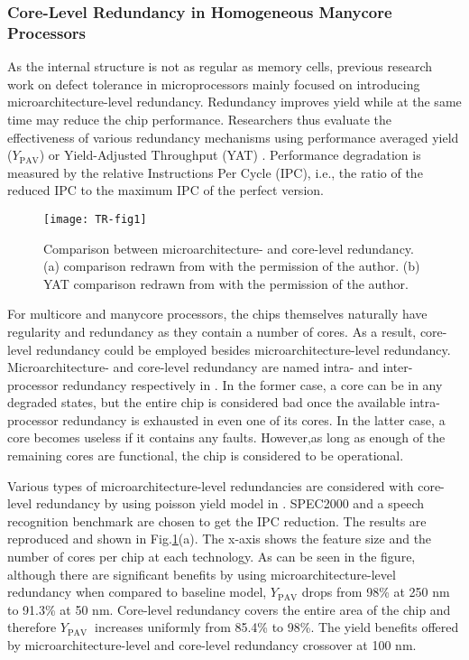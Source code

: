 \subsubsection{Core-Level Redundancy in Homogeneous Manycore Processors}
As the internal structure is not as regular as memory cells, previous research work on defect tolerance in microprocessors mainly focused on introducing microarchitecture-level redundancy. Redundancy improves yield while at the same time may reduce the chip performance. Researchers thus evaluate the effectiveness of various redundancy mechanisms using performance averaged yield ($Y_{\text{PAV}}$)\cite{shivakumar2003exploiting} or Yield-Adjusted Throughput (YAT) \cite{schuchman2005rescue}. Performance degradation is measured by the relative Instructions Per Cycle (IPC), i.e., the ratio of the reduced IPC to the maximum IPC of the perfect version.

\begin{figure}[t]
    \centering
        \texttt{[image: TR-fig1]}
          \caption{ Comparison between microarchitecture- and core-level redundancy.
          (a) comparison redrawn from \cite{shivakumar2003exploiting} with the permission of the author.
          (b) YAT comparison redrawn from \cite{schuchman2005rescue} with the permission of the author.}
             \label{fig1}
\end{figure}

For multicore and manycore processors, the chips themselves naturally have regularity and redundancy as they contain a number of cores. As a result, core-level redundancy could be employed besides microarchitecture-level redundancy. Microarchitecture- and core-level redundancy are named intra- and inter-processor redundancy respectively in \cite{shivakumar2003exploiting}. In the former case, a core can be in any degraded states, but the entire chip is considered bad once the available intra-processor redundancy is exhausted in even one of its cores. In the latter case, a core becomes useless if it contains any faults. However,as long as enough of the remaining cores are functional, the chip is considered to be operational.

Various types of microarchitecture-level redundancies are considered with core-level redundancy by using poisson yield model in \cite{shivakumar2003exploiting}. SPEC2000 and a speech recognition benchmark are chosen to get the IPC reduction. The results are reproduced and shown in Fig.\ref{fig1}(a). The x-axis shows the feature size and the number of cores per chip at each technology. As can be seen in the figure, although there are significant benefits by using microarchitecture-level redundancy when compared to baseline model, $Y_{\text{PAV}}$ drops from 98\% at 250 nm to 91.3\% at 50 nm. Core-level redundancy covers the entire area of the chip and therefore $Y_{\text{PAV }}$ increases uniformly from 85.4\% to 98\%. The yield benefits offered by microarchitecture-level and core-level redundancy crossover at 100 nm.

